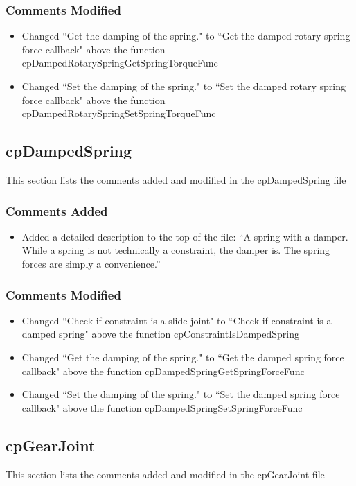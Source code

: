 \documentclass[12pt]{article}
\begin{document}
\subsubsection{Comments Modified}
\begin{itemize}
\item Changed ``Get the damping of the spring." to ``Get the damped rotary spring force callback" above the function cpDampedRotarySpringGetSpringTorqueFunc
\item Changed ``Set the damping of the spring." to ``Set the damped rotary spring force callback" above the function cpDampedRotarySpringSetSpringTorqueFunc
\end{itemize}

\subsection{cpDampedSpring} 
This section lists the comments added and modified  in the cpDampedSpring file

\subsubsection{Comments Added}
\begin{itemize}
\item Added a detailed description to the top of the file: ``A spring with a damper.
While a spring is not technically a constraint, the damper is. The spring forces are simply a convenience.''
\end{itemize}

\subsubsection{Comments Modified}
\begin{itemize}
\item Changed  ``Check if constraint is a slide joint" to ``Check if constraint is a damped spring" above the function cpConstraintIsDampedSpring
\item Changed ``Get the damping of the spring." to ``Get the damped spring force callback" above the function cpDampedSpringGetSpringForceFunc
\item Changed ``Set the damping of the spring." to ``Set the damped spring force callback" above the function cpDampedSpringSetSpringForceFunc
\end{itemize}

\subsection{cpGearJoint} 
This section lists the comments added and modified  in the cpGearJoint file
\end{document}
